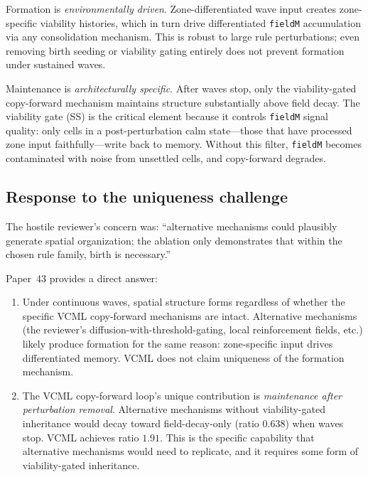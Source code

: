 \documentclass[11pt,a4paper]{article}
\begin{document}
Formation is \textit{environmentally driven}.  Zone-differentiated wave input creates
zone-specific viability histories, which in turn drive differentiated \texttt{fieldM}
accumulation via any consolidation mechanism.  This is robust to large rule
perturbations; even removing birth seeding or viability gating entirely does not prevent
formation under sustained waves.

Maintenance is \textit{architecturally specific}.  After waves stop, only the
viability-gated copy-forward mechanism maintains structure substantially above field
decay.  The viability gate (SS) is the critical element because it controls
\texttt{fieldM} signal quality: only cells in a post-perturbation calm state---those that
have processed zone input faithfully---write back to memory.  Without this filter,
\texttt{fieldM} becomes contaminated with noise from unsettled cells, and copy-forward
degrades.

\subsection{Response to the uniqueness challenge}

The hostile reviewer's concern was: ``alternative mechanisms could plausibly generate
spatial organization; the ablation only demonstrates that within the chosen rule family,
birth is necessary.''

Paper~43 provides a direct answer:

\begin{enumerate}
\item Under continuous waves, spatial structure forms regardless of whether the
  specific VCML copy-forward mechanisms are intact.  Alternative mechanisms (the
  reviewer's diffusion-with-threshold-gating, local reinforcement fields, etc.)
  likely produce formation for the same reason: zone-specific input drives differentiated
  memory.  VCML does not claim uniqueness of the formation mechanism.

\item The VCML copy-forward loop's unique contribution is \emph{maintenance after
  perturbation removal}.  Alternative mechanisms without viability-gated inheritance
  would decay toward field-decay-only (ratio $0.638$) when waves stop.  VCML achieves
  ratio $1.91$.  This is the specific capability that alternative mechanisms would need
  to replicate, and it requires some form of viability-gated inheritance.
\end{enumerate}
\end{document}
